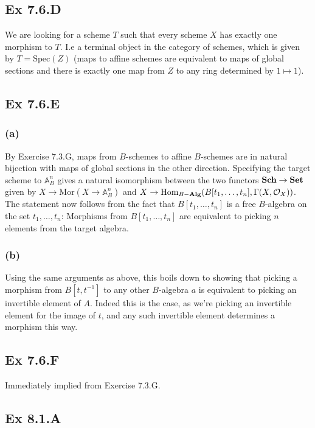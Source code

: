 \documentclass{article}
\theoremstyle{definition}
\newcommand{\A}{\mathbb{A}}
\newcommand{\An}{\A^n}
\newcommand{\Hom}{\text{Hom}}
\newcommand{\Mor}{\text{Mor}}
\newcommand{\Spec}{\text{Spec}}
\newcommand{\catname}[1]{{\normalfont\textbf{#1}}}
\newcommand{\Set}{\catname{Set}}
\newcommand{\Sch}{\catname{Sch}}
\newcommand{\Alg}{\catname{Alg}}
\begin{document}
\subsection*{Ex 7.6.D}

We are looking for a scheme $T$ such that every scheme $X$ has exactly one
morphism to $T$. I.e a terminal object in the category of schemes, which is
given by $T = \Spec(Z)$ (maps to affine schemes are equivalent to maps of
global sections and there is exactly one map from $Z$ to any ring determined by
$1 \mapsto 1$).

\subsection*{Ex 7.6.E}

\subsubsection*{(a)}

By Exercise 7.3.G, maps from $B$-schemes to affine $B$-schemes are in natural
bijection with maps of global sections in the other direction. Specifying the
target scheme to $\A^{n}_{B}$ gives a natural isomorphism between the two
functors $\Sch \to \Set$ given by $X \to \Mor(X \to \An_{B})$ and $X \to
	\Hom_{B-\Alg}(B[t_{1}, \ldots, t_n], \Gamma(X, \mathcal{O}_X))$. The statement
now follows from the fact that $B[t_{1}, \ldots, t_n]$ is a free $B$-algebra on
the set $t_{1}, \ldots, t_n$: Morphisms from $B[t_{1}, \ldots, t_n]$ are
equivalent to picking $n$ elements from the target algebra.

\subsubsection*{(b)}

Using the same arguments as above, this boils down to showing that picking a
morphism from $B[t, t^{-1}]$ to any other $B$-algebra $a$ is equivalent to
picking an invertible element of $A$. Indeed this is the case, as we're picking
an invertible element for the image of $t$, and any such invertible element
determines a morphism this way.

\subsection*{Ex 7.6.F}

Immediately implied from Exercise 7.3.G.

\subsection*{Ex 8.1.A}
\end{document}
